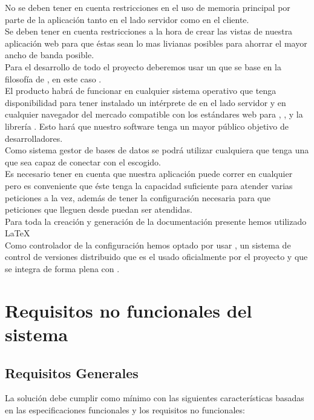 No se deben tener en cuenta restricciones en el uso de memoria
principal por parte de la aplicación tanto en el lado servidor como en
el cliente.\\

Se deben tener en cuenta restricciones a la hora de crear las vistas
de nuestra aplicación web para que éstas sean lo mas livianas posibles
para ahorrar el mayor ancho de banda posible.\\

Para el desarrollo de todo el proyecto deberemos usar un  que se
base en la filosofía de , en este caso
.\\

El producto habrá de funcionar en cualquier sistema operativo que
tenga disponibilidad para tener instalado un intérprete de
 en el lado servidor y en cualquier navegador del
mercado compatible con los estándares web para ,
, y la librería . Esto hará que
nuestro software tenga un mayor público objetivo de desarrolladores.\\

Como sistema gestor de bases de datos se podrá utilizar cualquiera que
tenga una  que sea capaz de conectar  con
el  escogido.\\

Es necesario tener en cuenta que nuestra aplicación puede correr en
cualquier  pero es conveniente que éste tenga la capacidad
suficiente para atender varias peticiones a la vez, además de tener la
configuración necesaria para que peticiones que lleguen desde
 puedan ser atendidas.\\

Para toda la creación y generación de la documentación presente hemos
utilizado LaTeX\\

Como controlador de la configuración hemos optado por usar
, un sistema de control de versiones distribuido que es
el usado oficialmente por el proyecto  y que se integra
de forma plena con .

\section{Requisitos no funcionales del sistema}
\subsection{Requisitos Generales}
La solución debe cumplir como mínimo con las siguientes
características basadas en las especificaciones funcionales y los
requisitos no funcionales:

